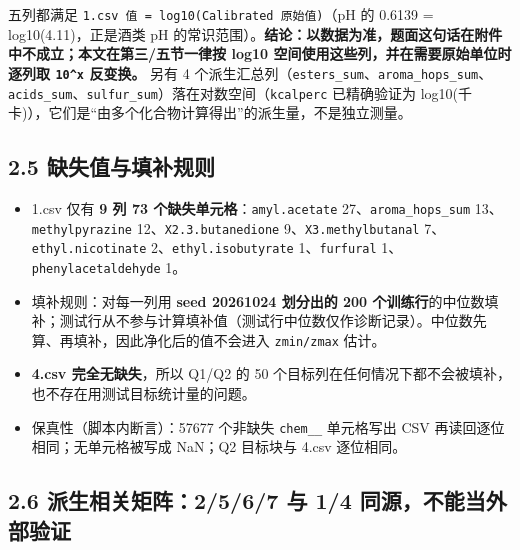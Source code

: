 \documentclass[
  11pt,
]{ctexart}
\providecommand{\tightlist}{%
  \setlength{\itemsep}{0pt}\setlength{\parskip}{0pt}}
\begin{document}
五列都满足 \texttt{1.\allowbreak{}csv\ 值\ =\ log10(Calibrated\ 原始值)}（pH 的
0.6139 = log10(4.11)，正是酒类 pH
的常识范围）。\textbf{结论：以数据为准，题面这句话在附件中不成立；本文在第三/五节一律按
log10 空间使用这些列，并在需要原始单位时逐列取 \texttt{10\^{}x}
反变换。} 另有 4
个派生汇总列（\texttt{esters\_sum}、\texttt{aroma\_\allowbreak{}hops\_\allowbreak{}sum}、\texttt{acids\_sum}、\texttt{sulfur\_sum}）落在对数空间（\texttt{kcalperc}
已精确验证为
log10(千卡)），它们是``由多个化合物计算得出''的派生量，不是独立测量。

\subsection{2.5
缺失值与填补规则}\label{ux7f3aux5931ux503cux4e0eux586bux8865ux89c4ux5219}

\begin{itemize}
\tightlist
\item
  1.csv 仅有 \textbf{9 列 73 个缺失单元格}：\texttt{amyl.acetate}
  27、\texttt{aroma\_\allowbreak{}hops\_\allowbreak{}sum} 13、\texttt{methylpyrazine}
  12、\texttt{X2.\allowbreak{}3.\allowbreak{}butanedione} 9、\texttt{X3.\allowbreak{}methylbutanal}
  7、\texttt{ethyl.\allowbreak{}nicotinate} 2、\texttt{ethyl.\allowbreak{}isobutyrate}
  1、\texttt{furfural} 1、\texttt{phenylacetaldehyde} 1。
\item
  填补规则：对每一列用 \textbf{seed 20261024 划分出的 200
  个训练行}的中位数填补；测试行从不参与计算填补值（测试行中位数仅作诊断记录）。中位数先算、再填补，因此净化后的值不会进入
  \texttt{zmin/zmax} 估计。
\item
  \textbf{4.csv 完全无缺失}，所以 Q1/Q2 的 50
  个目标列在任何情况下都不会被填补，也不存在用测试目标统计量的问题。
\item
  保真性（脚本内断言）：57677 个非缺失 \texttt{chem\_\_} 单元格写出 CSV
  再读回逐位相同；无单元格被写成 NaN；Q2 目标块与 4.csv 逐位相同。
\end{itemize}

\subsection{2.6 派生相关矩阵：2/5/6/7 与 1/4
同源，不能当外部验证}\label{ux6d3eux751fux76f8ux5173ux77e9ux96352567-ux4e0e-14-ux540cux6e90ux4e0dux80fdux5f53ux5916ux90e8ux9a8cux8bc1}
\end{document}

